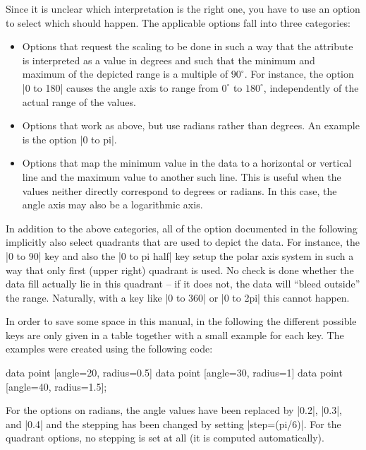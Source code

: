 Since it is unclear which interpretation is the right one, you have to use an
option to select which should happen. The applicable options fall into three
categories:
%
\begin{itemize}
    \item Options that request the scaling to be done in such a way that the
        attribute is interpreted as a value in degrees and such that the
        minimum and maximum of the depicted range is a multiple of $90^\circ$.
        For instance, the option |0 to 180| causes the angle axis to range from
        $0^\circ$ to $180^\circ$, independently of the actual range of the
        values.
    \item Options that work as above, but use radians rather than degrees. An
        example is the option |0 to pi|.
    \item Options that map the minimum value in the data to a horizontal or
        vertical line and the maximum value to another such line. This is
        useful when the values neither directly correspond to degrees or
        radians. In this case, the angle axis may also be a logarithmic axis.
\end{itemize}

In addition to the above categories, all of the option documented in the
following implicitly also select quadrants that are used to depict the data.
For instance, the |0 to 90| key and also the |0 to pi half| key setup the polar
axis system in such a way that only first (upper right) quadrant is used. No
check is done whether the data fill actually lie in this quadrant -- if it does
not, the data will ``bleed outside'' the range. Naturally, with a key like
|0 to 360| or |0 to 2pi| this cannot happen.

In order to save some space in this manual, in the following the different
possible keys are only given in a table together with a small example for each
key. The examples were created using the following code:
%
\begin{codeexample}[]
\tikz \datavisualization [
  scientific polar axes={
    clean,
    0 to 90  %
  },
  angle axis={ticks={step=30}},
  radius axis={length=1cm, ticks={step=1}},
  visualize as scatter]
data point [angle=20, radius=0.5]
data point [angle=30, radius=1]
data point [angle=40, radius=1.5];
\end{codeexample}

For the options on radians, the angle values have been replaced by |0.2|,
|0.3|, and |0.4| and the stepping has been changed by setting |step=(pi/6)|.
For the quadrant options, no stepping is set at all (it is computed
automatically).

